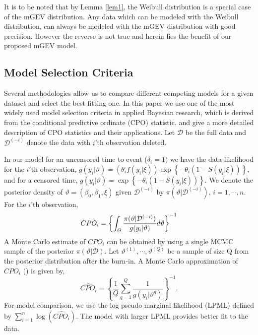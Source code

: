 \documentclass[smallextended]{svjour3}       %
\begin{document}
{It is to be noted that by Lemma \ref{lem1}, the Weibull distribution is a special case of the mGEV distribution. Any data which can be modeled with the Weibull distribution, can always be modeled with the mGEV distribution with good precision. However the reverse is not true and herein lies the benefit of our proposed mGEV model.  


\subsection{Model Selection Criteria}
Several methodologies allow us to compare different competing models for a given
dataset and select the best fitting one. In this paper we use one of the most widely used model selection criteria in applied Bayesian research, which is derived from the conditional predictive ordinate (CPO)
statistic. \citet{gelf:1992} and \citet{geisser:1979} give a more detailed description
of CPO statistics and their applications. Let $\mathcal{D}$ be the full data and
$\mathcal{D}^{(-i)}$ denote the data with $i$'th observation deleted.

In our model for an uncensored time to event ($\delta_i=1)$ we have the data likelihood for the $i'$th observation, $g(y_i|\vartheta)={(\theta_{i}f(y_{i}|\xi))}\exp\left\{ -\theta_{i}(1-S(y_{i}|\xi))\right\}$, and for a censored time, $g(y_i|\vartheta) = \exp\left\{ -\theta_{i}(1-S(y_{i}|\xi))\right\}.$
We denote the posterior density of $\vartheta=(\beta_0,\beta_1,\xi)$ given $\mathcal{D}^{(-i)}$
by $\pi(\vartheta|\mathcal{D}^{(-i)})$, $i=1,\cdots,n$. For the $i$'th observation,
$$ CPO_i = \left\{ \int_\mathnormal{\Theta} \frac{\pi(\vartheta|\mathcal{D}^{(-i)})}{g(y_i|\vartheta)} d\vartheta\right\}^{-1}$$
A Monte Carlo estimate of $CPO_i$ can be obtained by using a single MCMC sample of
the posterior $\pi(\vartheta|\mathcal{D})$. Let $\vartheta^{(1)},\cdots,\vartheta^{(Q)}$
be a sample of size Q from the posterior distribution after the burn-in.
A Monte Carlo approximation of $CPO_i$ (\citet{dey:1997}) is given by,
$$ \widehat{CPO_i} = \left\{\frac{1}{Q}\displaystyle\sum\limits_{q=1}^Q \frac{1}{g(y_i|\vartheta^{q})}\right\}^{-1}.$$
For model comparison, we use the log pseudo marginal likelihood (LPML) defined by $\displaystyle\sum\limits_{i=1}^n \log(\widehat{CPO_i}).$ The model with
larger LPML provides better fit to the data.

}
\end{document}
